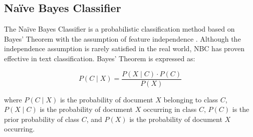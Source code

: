 \subsection{Na\"ive Bayes Classifier}

The Na\"ive Bayes Classifier is a probabilistic classification method based on Bayes' Theorem with the assumption of feature independence \cite{han2012}. Although the independence assumption is rarely satisfied in the real world, NBC has proven effective in text classification. Bayes' Theorem is expressed as:

\begin{equation}
P(C \mid X) = \frac{P(X \mid C) \cdot P(C)}{P(X)}
\end{equation}

where $P(C \mid X)$ is the probability of document $X$ belonging to class $C$, $P(X \mid C)$ is the probability of document $X$ occurring in class $C$, $P(C)$ is the prior probability of class $C$, and $P(X)$ is the probability of document $X$ occurring.
